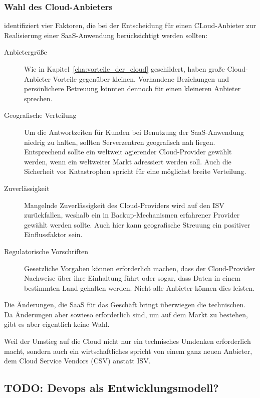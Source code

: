 \subsubsection{Wahl des Cloud-Anbieters}
 identifiziert vier Faktoren, die 
bei der Entscheidung für einen CLoud-Anbieter zur Realisierung einer 
SaaS-Anwendung berücksichtigt werden sollten:
\begin{description}
	\item[Anbietergröße] Wie in Kapitel~\ref{cha:vorteile_der_cloud} 
geschildert, haben große Cloud-Anbieter Vorteile gegenüber kleinen. Vorhandene 
Beziehungen und persönlichere Betreuung könnten dennoch für einen kleineren 
Anbieter sprechen.
	\item[Geografische Verteilung] Um die Antwortzeiten für Kunden bei 
Benutzung der SaaS-Anwendung niedrig zu halten, sollten Serverzentren 
geografisch nah liegen. Entsprechend sollte ein weltweit agierender 
Cloud-Provider gewählt werden, wenn ein weltweiter Markt adressiert werden 
soll. Auch die Sicherheit vor Katastrophen spricht für eine möglichst breite 
Verteilung.
	\item[Zuverlässigkeit] Mangelnde Zuverlässigkeit des Cloud-Providers 
wird auf den ISV zurückfallen, weshalb ein in Backup-Mechanismen erfahrener 
Provider gewählt werden sollte. Auch hier kann geografische Streuung ein 
positiver Einflussfaktor sein.
	\item[Regulatorische Vorschriften] Gesetzliche Vorgaben können 
erforderlich machen, dass der Cloud-Provider Nachweise über ihre Einhaltung 
führt oder sogar, dass Daten in einem bestimmten Land gehalten werden. Nicht 
alle Anbieter können dies leisten.
\end{description}


Die Änderungen, die SaaS für das Geschäft bringt überwiegen die 
technischen. Da Änderungen aber 
sowieso erforderlich sind, um auf 
dem Markt zu bestehen, gibt es aber 
eigentlich keine Wahl. 

Weil der Umstieg auf die Cloud nicht nur ein technisches Umdenken erforderlich 
macht, sondern auch ein wirtschaftliches spricht 
 von einem ganz neuen Anbieter, dem 
Cloud Service Vendors (CSV) anstatt ISV.

\subsection{TODO: Devops als Entwicklungsmodell?}

